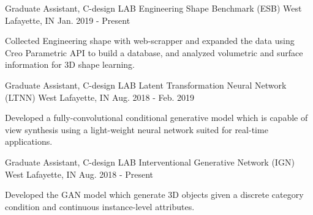 


\begin{cventries}

\cventry
{Graduate Assistant, C-design LAB} %
{Engineering Shape Benchmark (ESB)} %
{West Lafayette, IN} %
{Jan. 2019 - Present} %
{ %
\begin{cvitems}
\item {Collected Engineering shape with web-scrapper and expanded the data using Creo Parametric API to build a database, and analyzed volumetric and surface information for 3D shape learning.}
\end{cvitems}
}


\cventry
{Graduate Assistant, C-design LAB} %
{Latent Transformation Neural Network (LTNN)} %
{West Lafayette, IN} %
{Aug. 2018 - Feb. 2019} %
{ %
\begin{cvitems}
\item {Developed a fully-convolutional conditional generative model which is capable of view synthesis using a light-weight neural network suited for real-time applications.}
\end{cvitems}
}


\cventry
{Graduate Assistant, C-design LAB} %
{Interventional Generative Network (IGN)} %
{West Lafayette, IN} %
{Aug. 2018 - Present} %
{ %
\begin{cvitems}
\item {Developed the GAN model which generate 3D objects given a discrete
category condition and continuous instance-level attributes.}
\end{cvitems}
}


\end{cventries}
